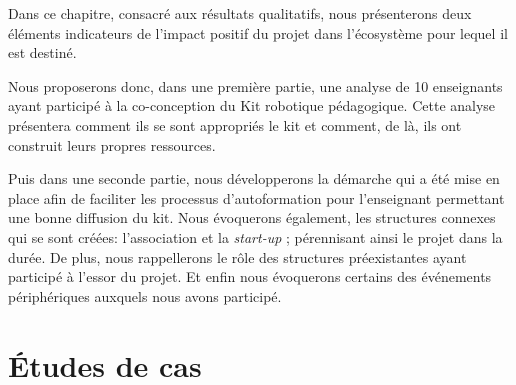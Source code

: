 \begin{resumChap}
Dans ce chapitre, consacré aux résultats qualitatifs, nous présenterons deux éléments indicateurs de l'impact positif du projet dans l'écosystème pour lequel il est destiné.\par%
Nous proposerons donc, dans une première partie, une analyse  de 10 enseignants ayant participé à la co-conception du Kit robotique pédagogique. Cette analyse présentera comment ils se sont appropriés le kit et comment, de là, ils ont construit leurs propres ressources.\par%
Puis dans une seconde partie, nous développerons la démarche qui a été mise en place afin de faciliter les processus d'autoformation pour l'enseignant permettant une bonne diffusion du kit. Nous évoquerons également, les structures connexes qui se sont créées: l'association  et la \textit{start-up} ; pérennisant ainsi le projet dans la durée. De plus, nous rappellerons le rôle des structures préexistantes ayant participé à l'essor du projet. Et enfin nous évoquerons certains des événements périphériques auxquels nous avons participé.
\end{resumChap}{}
\section{Études de cas}\label{sec:entretiens}

